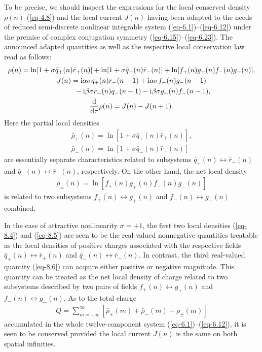\documentclass[10pt,a4paper]{amsart}
\numberwithin{equation}{section}
\begin{document}
To be precise, we should inspect the expressions for the local conserved density $\rho(n)$ (\ref{eq-4.8}) and the local current $J(n)$ having been adapted to the needs of reduced semi-discrete nonlinear integrable system (\ref{eq-6.1})--(\ref{eq-6.12}) under the premise of complex conjugation symmetry (\ref{eq-6.15})--(\ref{eq-6.23}). The announced adapted quantities as well as the respective local conservation law read as follows:
\begin{gather}%
	\rho(n) = \ln[1+\sigma\bar{q}_{+}(n)\bar{r}_{+}(n)] + \ln[1+\sigma\bar{q}_{-}(n)\bar{r}_{-}(n)] + \ln[f_{+}(n)g_{+}(n)f_{-}(n)g_{-}(n)],\nonumber
\\
	J(n)=\mathrm{i}\alpha\sigma q_{+}(n)r_{-}(n-1)+\mathrm{i}\alpha\sigma f_{+}(n)g_{-}(n-1)\nonumber\\
\hphantom{J(n)=}{}
 -\mathrm{i}\beta\sigma r_{+}(n)q_{-}(n-1) - \mathrm{i}\beta\sigma g_{+}(n)f_{-}(n-1),\label{eq-8.2}
\\ %
	\frac{\mathrm{d}}{\mathrm{d}\tau}\rho(n) = J(n) - J(n+1) .\nonumber
\end{gather}
Here the partial local densities
\begin{gather}\label{eq-8.4}
	\bar{\rho}_{+}(n) = \ln[1+\sigma\bar{q}_{+}(n)\bar{r}_{+}(n)],
\\
\label{eq-8.5}
	\bar{\rho}_{-}(n) = \ln[1+\sigma\bar{q}_{-}(n)\bar{r}_{-}(n)]
\end{gather}
are essentially separate characteristics related to subsystems
 $\bar{q}_{+}(n)\leftrightarrow \bar{r}_{+}(n)$ and $\bar{q}_{-}(n)\leftrightarrow \bar{r}_{-}(n)$, respectively.
On the other hand, the net local density
\begin{gather}\label{eq-8.6}
	\rho_{\pm}(n) = \ln[f_{+}(n)g_{+}(n)f_{-}(n)g_{-}(n)]
\end{gather}
is related to two subsystems $f_{+}(n)\leftrightarrow g_{+}(n)$ and $f_{-}(n) \leftrightarrow g_{-}(n)$ combined.

In the case of attractive nonlinearity $\sigma=+1$, the first two local densities (\ref{eq-8.4}) and (\ref{eq-8.5}) are seen to be the real-valued nonnegative quantities treatable as the local densities of positive charges associated with the respective fields $\bar{q}_{+}(n)\leftrightarrow \bar{r}_{+}(n)$ and $\bar{q}_{-}(n)\leftrightarrow \bar{r}_{-}(n)$. In contrast, the third real-valued quantity (\ref{eq-8.6}) can acquire either positive or negative magnitude. This quantity can be treated as the net local density of charge related to two subsystems described by two pairs of fields $f_{+}(n)\leftrightarrow g_{+}(n)$ and $f_{-}(n) \leftrightarrow g_{-}(n)$. As to the total charge
\begin{gather}\label{eq-8.7}
	Q = \sum_{m=-\infty}^\infty [\bar{\rho}_{+}(m) + \bar{\rho}_{-}(m) + \rho_{\pm}(m)]
\end{gather}
accumulated in the whole twelve-component system (\ref{eq-6.1})--(\ref{eq-6.12}), it is seen to be conserved provided the local current $J(n)$ is the same on both spatial infinities.
\end{document}
